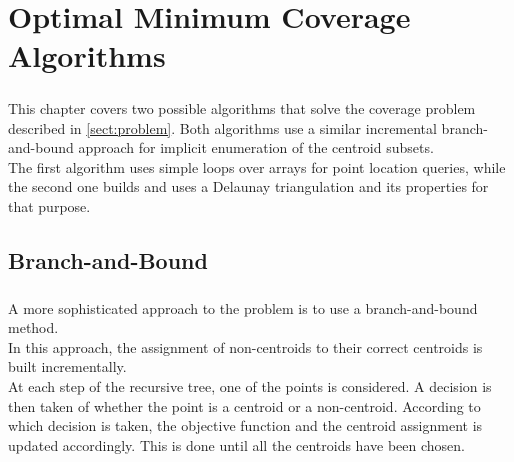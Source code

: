 \chapter{Optimal Minimum Coverage Algorithms}
\label{chap:algos}
\paragraph{}
This chapter covers two possible algorithms that solve the coverage problem described in \ref{sect:problem}. Both algorithms use a similar incremental branch-and-bound approach for implicit enumeration of the centroid subsets.\\
The first algorithm uses simple loops over arrays for point location queries, while the second one builds and uses a Delaunay triangulation and its properties for that purpose.

\section{Branch-and-Bound}
\label{sect:bb}
\paragraph{}
A more sophisticated approach to the problem is to use a branch-and-bound method.\\
In this approach, the assignment of non-centroids to their correct centroids is built incrementally.\\
At each step of the recursive tree, one of the points is considered. A decision is then taken of whether the point is a centroid or a non-centroid. According to which decision is taken, the objective function and the centroid assignment is updated accordingly. This is done until all the centroids have been chosen.
